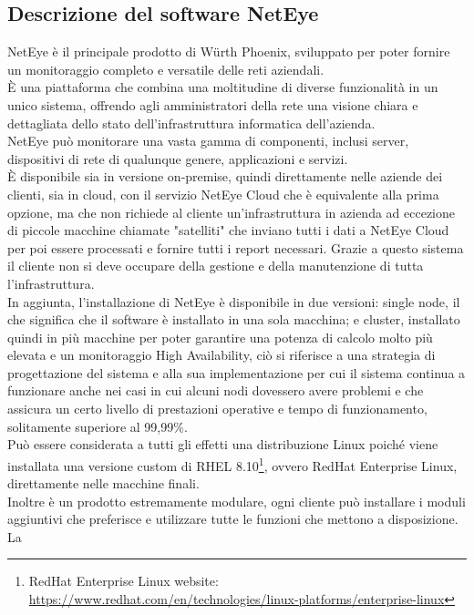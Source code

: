 \subsection{Descrizione del software NetEye}
\label{sub:neteye} NetEye è il principale prodotto di Würth Phoenix, sviluppato per
poter fornire un monitoraggio completo e versatile delle reti aziendali.\\ È una
piattaforma che combina una moltitudine di diverse funzionalità in un unico sistema,
offrendo agli amministratori della rete una visione chiara e dettagliata dello
stato dell'infrastruttura informatica dell'azienda.\\ NetEye può monitorare una
vasta gamma di componenti, inclusi server, dispositivi di rete di qualunque
genere, applicazioni e servizi.\\ È disponibile sia in versione on-premise,
quindi direttamente nelle aziende dei clienti, sia in cloud, con il servizio
NetEye Cloud che è equivalente alla prima opzione, ma che non richiede al cliente
un'infrastruttura in azienda ad eccezione di piccole macchine chiamate "satelliti"
che inviano tutti i dati a NetEye Cloud per poi essere processati e fornire tutti
i report necessari. Grazie a questo sistema il cliente non si deve occupare
della gestione e della manutenzione di tutta l'infrastruttura.\\ In aggiunta, l'installazione
di NetEye è disponibile in due versioni: single node, il che significa che il software
è installato in una sola macchina; e cluster, installato quindi in più macchine per
poter garantire una potenza di calcolo molto più elevata e un monitoraggio High Availability,
ciò si riferisce a una strategia di progettazione del sistema e alla sua
implementazione per cui il sistema continua a funzionare anche nei casi in cui
alcuni nodi dovessero avere problemi e che assicura un certo livello di
prestazioni operative e tempo di funzionamento, solitamente superiore al 99,99\%.\\
Può essere considerata a tutti gli effetti una distribuzione Linux poiché viene
installata una versione custom di RHEL 8.10\footnote{RedHat Enterprise Linux
website: \url{https://www.redhat.com/en/technologies/linux-platforms/enterprise-linux}},
ovvero RedHat Enterprise Linux, direttamente nelle macchine finali.\\ Inoltre è un
prodotto estremamente modulare, ogni cliente può installare i moduli aggiuntivi
che preferisce e utilizzare tutte le funzioni che mettono a disposizione.\\ La
